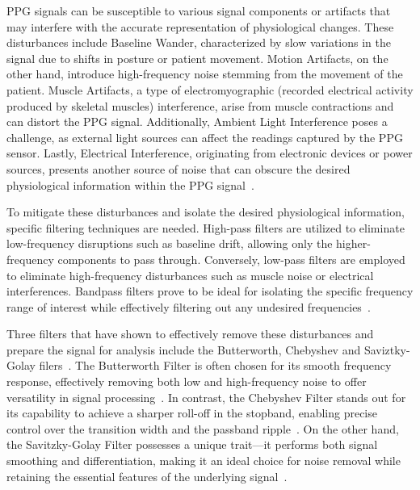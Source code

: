 
PPG signals can be susceptible to various signal components or artifacts that may interfere with the accurate representation of physiological changes.
These disturbances include Baseline Wander, characterized by slow variations in the signal due to shifts in posture or patient movement.
Motion Artifacts, on the other hand, introduce high-frequency noise stemming from the movement of the patient.
Muscle Artifacts, a type of electromyographic (recorded electrical activity produced by skeletal muscles) interference, arise from muscle contractions and can distort the PPG signal.
Additionally, Ambient Light Interference poses a challenge, as external light sources can affect the readings captured by the PPG sensor.
Lastly, Electrical Interference, originating from electronic devices or power sources, presents another source of noise that can obscure the desired physiological information within the PPG signal~\cite{maityPPGMotionModelbasedDetection2022}.


To mitigate these disturbances and isolate the desired physiological information, specific filtering techniques are needed.
High-pass filters are utilized to eliminate low-frequency disruptions such as baseline drift, allowing only the higher-frequency components to pass through.
Conversely, low-pass filters are employed to eliminate high-frequency disturbances such as muscle noise or electrical interferences.
Bandpass filters prove to be ideal for isolating the specific frequency range of interest while effectively filtering out any undesired frequencies~\cite{rajivLowPassHigh2022}.


Three filters that have shown to effectively remove these disturbances and prepare the signal for analysis include the Butterworth, Chebyshev and Saviztky-Golay filers~\cite{kanwalComparativeAnalysisPhotoplethysmography2023}.
The Butterworth Filter is often chosen for its smooth frequency response, effectively removing both low and high-frequency noise to offer versatility in signal processing~\cite{storrButterworthFilterDesign2013}.
In contrast, the Chebyshev Filter stands out for its capability to achieve a sharper roll-off in the stopband, enabling precise control over the transition width and the passband ripple~\cite{ChebyshevFilterOverview}.
On the other hand, the Savitzky-Golay Filter possesses a unique trait—it performs both signal smoothing and differentiation, making it an ideal choice for noise removal while retaining the essential features of the underlying signal~\cite{gallagherSavitzkyGolaySmoothingDifferentiation}.

